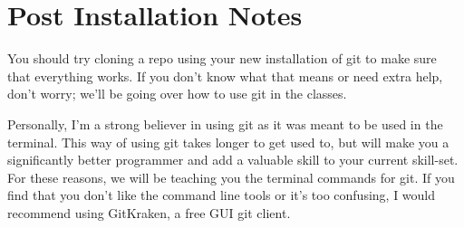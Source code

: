 \documentclass[11pt,fleqn]{article}
\begin{document}
\section*{Post Installation Notes}
You should try cloning a repo using your new installation of git to make sure that everything
works. If you don't know what that means or need extra help, don't worry; we'll be going over how
to use git in the classes.

Personally, I'm a strong believer in using git as it was meant to be used in the terminal. This
way of using git takes longer to get used to, but will make you a significantly better programmer
and add a valuable skill to your current skill-set. For these reasons, we will be teaching you the
terminal commands for git. If you find that you don't like the command line tools or it's too
confusing, I would recommend using GitKraken, a free GUI git client.
\end{document}
